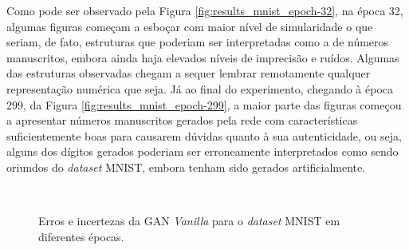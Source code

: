 Como pode ser observado pela Figura \ref{fig:results_mnist_epoch-32}, na época 32, algumas figuras começam a esboçar com maior nível de simularidade o que seriam, de fato, estruturas que poderiam ser interpretadas como a de números manuscritos, embora ainda haja elevados níveis de imprecisão e ruídos. Algumas das estruturas observadas chegam a sequer lembrar remotamente qualquer representação numérica que seja. Já ao final do experimento, chegando à época 299, da Figura \ref{fig:results_mnist_epoch-299}, a maior parte das figuras começou a apresentar números manuscritos gerados pela rede com características suficientemente boas para causarem dúvidas quanto à sua autenticidade, ou seja, alguns dos dígitos gerados poderiam ser erroneamente interpretados como sendo oriundos do \textit{dataset} MNIST, embora tenham sido gerados artificialmente.


\begin{figure}[H]
    \centering
    \\
    \vspace{0.5cm}
    \caption{Erros e incertezas da GAN \textit{Vanilla} para o \textit{dataset} MNIST em diferentes épocas.}
    \label{fig:results_pytorch_vanilla_mnist_scores}
\end{figure}